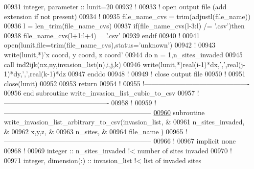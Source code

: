 \begin{DoxyCode}
00931 \textcolor{keywordtype}{integer}, \textcolor{keywordtype}{parameter} :: lunit=20
00932 \textcolor{comment}{!}
00933 \textcolor{comment}{! open output file (add extension if not present)}
00934 \textcolor{comment}{!}
00935 file\_name\_cvs = trim(adjustl(file\_name))
00936 l = len\_trim(file\_name\_cvs)
00937 \textcolor{keyword}{if}(file\_name\_cvs(l-3:l) /= \textcolor{stringliteral}{'.csv'})\textcolor{keyword}{then}
00938    file\_name\_cvs(l+1:l+4) = \textcolor{stringliteral}{'.csv'}
00939 \textcolor{keyword}{endif}
00940 \textcolor{comment}{!}
00941 \textcolor{keyword}{open}(lunit,file=trim(file\_name\_cvs),status=\textcolor{stringliteral}{'unknown'})
00942 \textcolor{comment}{!}
00943 \textcolor{keyword}{write}(lunit,*)\textcolor{stringliteral}{'x coord, y coord, z coord'}
00944 \textcolor{keyword}{do} n = 1,n\_sites\_invaded
00945    call ind2ijk(nx,ny,invasion\_list(n),i,j,k)
00946    \textcolor{keyword}{write}(lunit,*)\textcolor{keywordtype}{real}(i-1)*dx,\textcolor{stringliteral}{','},\textcolor{keywordtype}{real}(j-1)*dy,\textcolor{stringliteral}{','},\textcolor{keywordtype}{real}(k-1)*dz
00947 \textcolor{keyword}{enddo}
00948 \textcolor{comment}{!}
00949 \textcolor{comment}{! close output file}
00950 \textcolor{comment}{!}
00951 \textcolor{keyword}{close}(lunit)
00952 
00953 return
00954 \textcolor{comment}{!}
00955 \textcolor{comment}{!----------------------------------------------}
00956 \textcolor{keyword}{end subroutine write\_invasion\_list\_cubic\_to\_csv}
00957 \textcolor{comment}{!----------------------------------------------}
00958 \textcolor{comment}{!}
00959 \textcolor{comment}{!-----------------------------------------------------------------}
\hypertarget{module__write__output__files_8f90_source_l00960}{}\hyperlink{classmodule__write__output__files_a75c194ae97636d9f9de1280ee60cb3f4}{00960} \textcolor{keyword}{subroutine }write\_invasion\_list\_arbitrary\_to\_csv(invasion\_list,   &
00961                                                 n\_sites\_invaded, &
00962                                                 x,y,z,           &
00963                                                 n\_sites,         &
00964                                                 file\_name        )        
00965 \textcolor{comment}{!-----------------------------------------------------------------}
00966 \textcolor{comment}{!}
00967 \textcolor{keyword}{implicit none}
00968 \textcolor{comment}{!}
00969 \textcolor{keywordtype}{integer} :: n\_sites\_invaded \textcolor{comment}{!< number of sites invaded}
00970 \textcolor{comment}{!}
00971 \textcolor{keywordtype}{integer}, \textcolor{keywordtype}{dimension(:)} :: invasion\_list \textcolor{comment}{!< list of invaded sites}

\end{DoxyCode}
